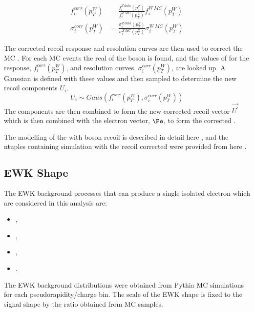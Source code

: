 \begin{align}
f^{corr}_i (p^{W}_T)      
  &= \frac{ f^{Z\ data}_i (p^{Z}_T) }
          { f^{Z\ MC}_i (p^{Z}_T) }
          f^{W\ MC}_i (p^{W}_T) \\
\sigma^{corr}_i (p^{W}_T) 
  &= \frac{ \sigma^{Z\ data}_i (p^{Z}_T) }
          { \sigma^{Z\ MC}_i (p^{Z}_T) }
          \sigma^{W\ MC}_i (p^{W}_T) 
\end{align}

The corrected recoil response and resolution curves are then used to correct the
\PW \ac{MC} \ETm. For each \PW \ac{MC} events the real \pT of the boson is
found, and the values of for the response, $f^{corr}_i (p^{W}_T)$, and
resolution curves, $\sigma^{corr}_i (p^{W}_T) $, are looked up. A Gaussian is
defined with these values and then sampled to determine the new recoil
components $U_i$.
\begin{equation}
U_i \sim Gaus(f^{corr}_i (p^{W}_T), \sigma^{corr}_i (p^{W}_T) )
\end{equation}
The components are then combined to form the new corrected recoil vector
$\vec{U^{\prime}}$ which is then combined with the electron vector, $\Pe$, to
form the corrected \ETm.

The modelling of the \HepProcess{\PW\to\Plepton\Pnu} \ETm with boson recoil is
described in detail here \cite{NULL}, and the ntuples containing
\HepProcess{\PW\to\Pelectron\Pnu} simulation with the recoil corrected \ETm were
provided from here \cite{NULL}.

\subsection{\ac{EWK} \ETm Shape}
The EWK background processes that can produce a single isolated
electron which are considered in this analysis are:
\begin{itemize}
\item \HepProcess{\PZ\to\Pelectron\APelectron},
\item \HepProcess{\PZ\to\Ptauon\APtauon},
\item \HepProcess{\PW\to\Ptau\Pnu},
\item \HepProcess{\Ptop\APtop}.
\end{itemize}

The \ac{EWK} background \ETm distributions were obtained from Pythia \ac{MC}
simulations for each pseudorapidity/charge bin.  The scale of the \ac{EWK} shape
is fixed to the signal \ETm shape by the ratio obtained from \ac{MC} samples.

